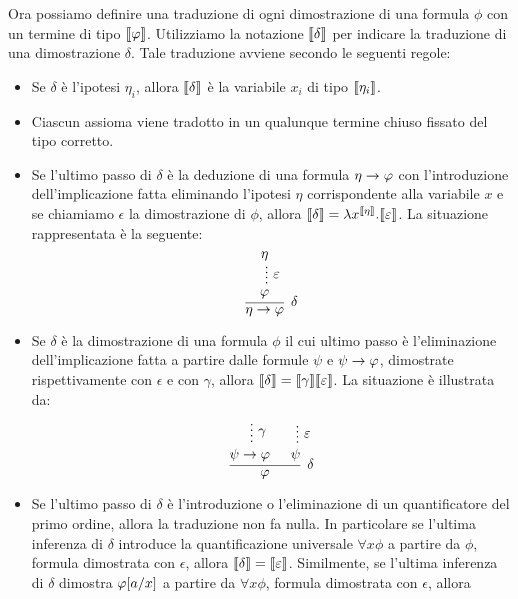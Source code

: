 \documentclass[]{marticle}
\begin{document}
Ora possiamo definire una traduzione di ogni dimostrazione di una formula $\phi$
con un termine di tipo $\llbracket \varphi \rrbracket$. Utilizziamo la notazione $\llbracket \delta \rrbracket$ per
indicare la traduzione di una dimostrazione $\delta$. Tale traduzione avviene
secondo le seguenti regole:
\begin{itemize}
    \item Se $\delta$ \`e l'ipotesi $\eta_i$, allora $\llbracket \delta \rrbracket$ \`e la
        variabile $x_i$ di tipo $\llbracket \eta_i \rrbracket$.
    \item Ciascun assioma viene tradotto in un qualunque termine chiuso fissato
        del tipo corretto.
    \item Se l'ultimo passo di $\delta$ \`e la deduzione di una formula
        $\eta\rightarrow\varphi$ con l'introduzione dell'implicazione fatta eliminando
        l'ipotesi $\eta$ corrispondente alla variabile $x$ e se chiamiamo
        $\epsilon$ la dimostrazione di $\phi$, allora $\llbracket \delta \rrbracket = \lambda
        x^{\llbracket \eta \rrbracket}. \llbracket \varepsilon \rrbracket$. La situazione rappresentata \`e la
        seguente:
        \[
            \begin{prooftree}
                \hypo{\eta}
                \ellipsis{$\epsilon$}{\phi}
                \infer1[$\delta$]{\eta\rar\phi} 
            \end{prooftree}
        \]
    \item Se $\delta$ \`e la dimostrazione di una formula $\phi$ il cui ultimo
        passo \`e l'eliminazione dell'implicazione fatta a partire dalle formule
        $\psi$ e $\psi\rightarrow\varphi$, dimostrate rispettivamente con $\epsilon$ e con
        $\gamma$, allora $\llbracket \delta \rrbracket = \llbracket \gamma \rrbracket\llbracket \varepsilon \rrbracket$.
        La situazione \`e illustrata da:
        \[
            \begin{prooftree}
                \hypo{}
                \ellipsis{$\gamma$}{\psi\rar\phi}
                \hypo{}
                \ellipsis{$\epsilon$}{\psi}
                \infer2[$\delta$]{\phi}
            \end{prooftree}
        \]
    \item Se l'ultimo passo di $\delta$ \`e l'introduzione o l'eliminazione di
        un quantificatore del primo ordine, allora la traduzione non fa nulla.
        In particolare se l'ultima inferenza di $\delta$ introduce la
        quantificazione universale $\forall x\phi$ a partire da $\phi$, formula
        dimostrata con $\epsilon$, allora $\llbracket \delta \rrbracket=\llbracket \varepsilon \rrbracket$.
        Similmente, se l'ultima inferenza di $\delta$ dimostra $\varphi [a/x]$
        a partire da $\forall x \phi$, formula dimostrata con $\epsilon$, allora

\end{itemize}
\end{document}
